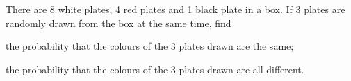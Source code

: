
There are 8 white plates, 4 red plates and 1 black plate in a box. If 3 plates are randomly drawn from the box at the same time, find
\begin{enumx}[label=(\alph*)]
    \item the probability that the colours of the 3 plates drawn are the same;
    \item the probability that the colours of the 3 plates drawn are all different.
\end{enumx}






